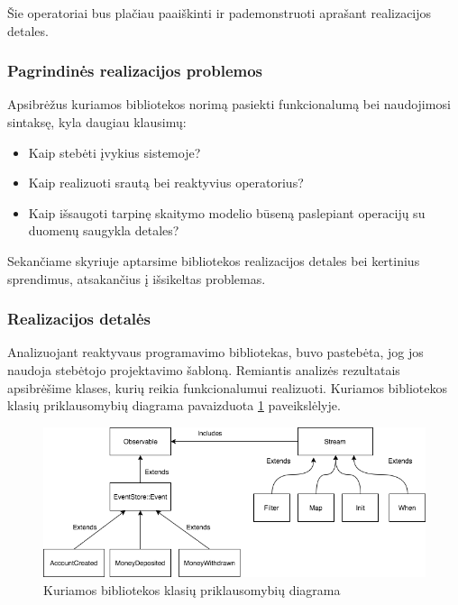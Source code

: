 Šie operatoriai bus plačiau paaiškinti ir pademonstruoti aprašant realizacijos detales.

\subsubsection{Pagrindinės realizacijos problemos}

Apsibrėžus kuriamos bibliotekos norimą pasiekti funkcionalumą bei naudojimosi sintaksę, kyla daugiau klausimų:

\begin{itemize}
  \item Kaip stebėti įvykius sistemoje?
  \item Kaip realizuoti srautą bei reaktyvius operatorius?
  \item Kaip išsaugoti tarpinę skaitymo modelio būseną paslepiant operacijų su duomenų saugykla detales?
\end{itemize}

Sekančiame skyriuje aptarsime bibliotekos realizacijos detales bei kertinius sprendimus, atsakančius į išsikeltas problemas.

\subsubsection{Realizacijos detalės}

Analizuojant reaktyvaus programavimo bibliotekas, buvo pastebėta, jog jos naudoja stebėtojo projektavimo šabloną. Remiantis analizės rezultatais apsibrėšime klases, kurių reikia funkcionalumui realizuoti. Kuriamos bibliotekos klasių priklausomybių diagrama pavaizduota \ref{img:class_diagram} paveikslėlyje.

\begin{figure}[H]
    \centering
    \includegraphics[scale=0.6]{img/class_diagram}
    \caption{Kuriamos bibliotekos klasių priklausomybių diagrama}
    \label{img:class_diagram}
\end{figure}

